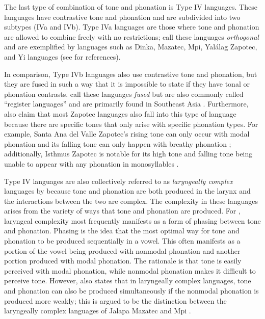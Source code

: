 The last type of combination of tone and phonation is Type IV languages. These languages have contrastive tone and phonation and are subdivided into two subtypes (IVa and IVb). Type IVa languages are those where tone and phonation are allowed to combine freely with no restrictions; \citet{espositoCrosslinguisticPatternsPhonation2020} call these languages \textit{orthogonal} and are exemplified by languages such as Dinka, Mazatec, Mpi, Yalálag Zapotec, and Yi languages (see \cite{espositoCrosslinguisticPatternsPhonation2020} for references).

In comparison, Type IVb languages also use contrastive tone and phonation, but they are fused in such a way that it is impossible to state if they have tonal or phonation contrasts. \citet{espositoCrosslinguisticPatternsPhonation2020} call these languages \textit{fused} but are also commonly called ``register languages'' and are primarily found in Southeast Asia \citep{brunelleTonePhonationSoutheast2016,enfieldArealLinguisticsMainland2005,masicaDefiningLinguisticArea1976}. Furthermore, \citet{espositoCrosslinguisticPatternsPhonation2020} also claim that most Zapotec languages also fall into this type of language because there are specific tones that only arise with specific phonation types. For example, Santa Ana del Valle Zapotec's rising tone can only occur with modal phonation and its falling tone can only happen with breathy phonation \citep{espositoVariationContrastivePhonation2010}; additionally, Isthmus Zapotec is notable for its high tone and falling tone being unable to appear with any phonation in monosyllables \citep{pickettIsthmusJuchitanZapotec2010}. 

Type IV languages are also collectively referred to as \textit{laryngeally complex} languages by \citet{silvermanLaryngealComplexityOtomanguean1997,silvermanPhasingRecoverability1997} because tone and phonation are both produced in the larynx and the interactions between the two are complex. The complexity in these languages arises from the variety of ways that tone and phonation are produced. For \citeauthor{silvermanLaryngealComplexityOtomanguean1997}, laryngeal complexity most frequently manifests as a form of phasing between tone and phonation. Phasing is the idea that the most optimal way for tone and phonation to be produced sequentially in a vowel. This often manifests as a portion of the vowel being produced with nonmodal phonation and another portion produced with modal phonation. The rationale is that tone is easily perceived with modal phonation, while nonmodal phonation makes it difficult to perceive tone. However, \citeauthor{silvermanLaryngealComplexityOtomanguean1997} also states that in laryngeally complex languages, tone and phonation can also be produced simultaneously if the nonmodal phonation is produced more weakly; this is argued to be the distinction between the laryngeally complex languages of Jalapa Mazatec and Mpi \citep{ladefogedSoundsWorldsLanguages1996,silvermanLaryngealComplexityOtomanguean1997}.  

